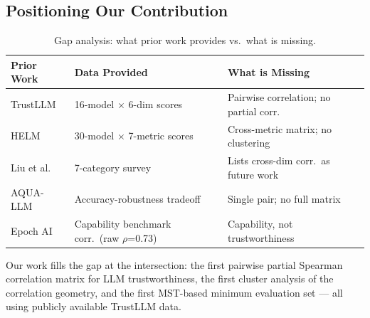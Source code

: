 \subsection{Positioning Our Contribution}

\begin{table}[h]
\centering
\caption{Gap analysis: what prior work provides vs.\ what is missing.}
\label{tab:gap}
\begin{tabular}{lll}
\toprule
\textbf{Prior Work} & \textbf{Data Provided} & \textbf{What is Missing} \\
\midrule
TrustLLM \cite{sun2024trustllm} & 16-model $\times$ 6-dim scores & Pairwise correlation; no partial corr. \\
HELM \cite{liang2023helm} & 30-model $\times$ 7-metric scores & Cross-metric matrix; no clustering \\
Liu et al.\ \cite{liu2023trustworthy} & 7-category survey & Lists cross-dim corr.\ as future work \\
AQUA-LLM \cite{gungor2025aquallm} & Accuracy-robustness tradeoff & Single pair; no full matrix \\
Epoch AI \cite{epochai2024} & Capability benchmark corr.\ (raw $\rho$=0.73) & Capability, not trustworthiness \\
\bottomrule
\end{tabular}
\end{table}

Our work fills the gap at the intersection: the first pairwise partial Spearman correlation matrix for LLM trustworthiness, the first cluster analysis of the correlation geometry, and the first MST-based minimum evaluation set --- all using publicly available TrustLLM data.
